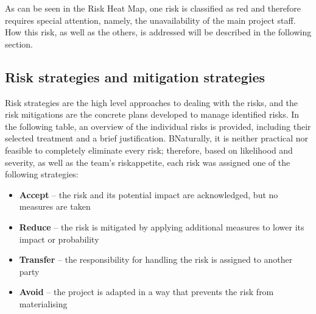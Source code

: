 As can be seen in the Risk Heat Map, one risk is classified as red and therefore requires special attention, namely, the unavailability of the main project staff. How this risk, as well as the others, is addressed will be described in the following section.

\subsection*{Risk strategies and mitigation strategies}

Risk strategies are the high level approaches to dealing with the risks, and the risk mitigations are the concrete plans developed to manage identified risks. In the following table, an overview of the individual risks is provided, including their selected treatment and a brief justification. BNaturally, it is neither practical nor feasible to completely eliminate every risk; therefore, based on likelihood and severity, as well as the team’s \gls{riskappetite}, each risk was assigned one of the following strategies:

\begin{itemize}
\item \textbf{Accept} – the risk and its potential impact are acknowledged, but no measures are taken
\item \textbf{Reduce} – the risk is mitigated by applying additional measures to lower its impact or probability
\item \textbf{Transfer} – the responsibility for handling the risk is assigned to another party
\item \textbf{Avoid} – the project is adapted in a way that prevents the risk from materialising
\end{itemize}

